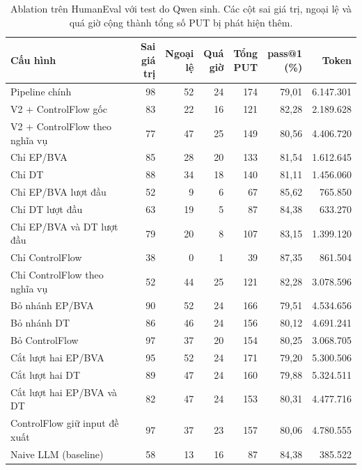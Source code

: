 \begin{table}[H]
\centering
\caption[Ablation trên HumanEval với test do Qwen sinh]{Ablation trên HumanEval với test do Qwen sinh. Các cột sai giá trị, ngoại lệ và quá giờ cộng thành tổng số PUT bị phát hiện thêm.}
\label{tab:ablation}
\small
\begin{tabular*}{\linewidth}{@{\extracolsep{\fill}}lrrrrrr@{}}
\toprule
Cấu hình & \shortstack[r]{Sai\\giá trị} & \shortstack[r]{Ngoại\\lệ} & \shortstack[r]{Quá\\giờ} & \shortstack[r]{Tổng\\PUT} & \shortstack[r]{pass@1\\(\%)} & Token \\
\midrule
Pipeline chính & 98 & 52 & 24 & 174 & 79,01 & 6.147.301 \\
V2 + ControlFlow gốc & 83 & 22 & 16 & 121 & 82,28 & 2.189.628 \\
V2 + ControlFlow theo nghĩa vụ & 77 & 47 & 25 & 149 & 80,56 & 4.406.720 \\
\midrule
Chỉ EP/BVA & 85 & 28 & 20 & 133 & 81,54 & 1.612.645 \\
Chỉ DT & 88 & 34 & 18 & 140 & 81,11 & 1.456.060 \\
Chỉ EP/BVA lượt đầu & 52 & 9 & 6 & 67 & 85,62 & 765.850 \\
Chỉ DT lượt đầu & 63 & 19 & 5 & 87 & 84,38 & 633.270 \\
Chỉ EP/BVA và DT lượt đầu & 79 & 20 & 8 & 107 & 83,15 & 1.399.120 \\
Chỉ ControlFlow & 38 & 0 & 1 & 39 & 87,35 & 861.504 \\
Chỉ ControlFlow theo nghĩa vụ & 52 & 44 & 25 & 121 & 82,28 & 3.078.596 \\
\midrule
Bỏ nhánh EP/BVA & 90 & 52 & 24 & 166 & 79,51 & 4.534.656 \\
Bỏ nhánh DT & 86 & 46 & 24 & 156 & 80,12 & 4.691.241 \\
Bỏ ControlFlow & 97 & 37 & 20 & 154 & 80,25 & 3.068.705 \\
\midrule
Cắt lượt hai EP/BVA & 95 & 52 & 24 & 171 & 79,20 & 5.300.506 \\
Cắt lượt hai DT & 89 & 47 & 24 & 160 & 79,88 & 5.324.511 \\
Cắt lượt hai EP/BVA và DT & 82 & 47 & 24 & 153 & 80,31 & 4.477.716 \\
ControlFlow giữ input đề xuất & 97 & 37 & 23 & 157 & 80,06 & 4.780.555 \\
\midrule
Naive LLM (baseline) & 58 & 13 & 16 & 87 & 84,38 & 385.522 \\
\bottomrule
\end{tabular*}
\end{table}

